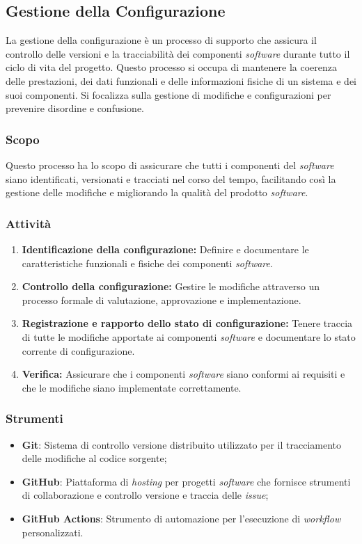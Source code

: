 \subsection{Gestione della Configurazione}

La gestione della configurazione è un processo di supporto che assicura il
controllo delle versioni e la tracciabilità dei componenti \textit{software}
durante tutto il ciclo di vita del progetto.
Questo processo si occupa di mantenere la coerenza delle prestazioni, dei dati
funzionali e delle informazioni fisiche di un sistema e dei suoi componenti.
Si focalizza sulla gestione di modifiche e configurazioni per prevenire
disordine e confusione.

\subsubsection{Scopo}
Questo processo ha lo scopo di assicurare che tutti i componenti del
\textit{software} siano identificati, versionati e tracciati nel corso del
tempo, facilitando così la gestione delle modifiche e migliorando la qualità
del prodotto \textit{software}.

\subsubsection{Attività}
\begin{enumerate}
	\item \textbf{Identificazione della configurazione:} Definire e documentare
	      le caratteristiche funzionali e fisiche dei componenti
	      \textit{software}.
	\item \textbf{Controllo della configurazione:} Gestire le modifiche
	      attraverso un processo formale di valutazione, approvazione e
	      implementazione.
	\item \textbf{Registrazione e rapporto dello stato di configurazione:}
	      Tenere traccia di tutte le modifiche apportate ai componenti
	      \textit{software} e documentare lo stato corrente di configurazione.
	\item \textbf{Verifica:} Assicurare che i componenti \textit{software} siano
	      conformi ai requisiti e che le modifiche siano implementate
	      correttamente.
\end{enumerate}

\subsubsection{Strumenti}
\begin{itemize}
	\item \textbf{Git}: Sistema di controllo versione distribuito utilizzato per
	      il tracciamento delle modifiche al codice sorgente;
	\item \textbf{GitHub\g}: Piattaforma di \textit{hosting} per progetti \textit{software}
	      che fornisce strumenti di collaborazione e controllo versione e
	      traccia delle \textit{issue\g};
	\item \textbf{GitHub Actions}: Strumento di automazione per l'esecuzione di
	      \textit{workflow} personalizzati.
\end{itemize}
